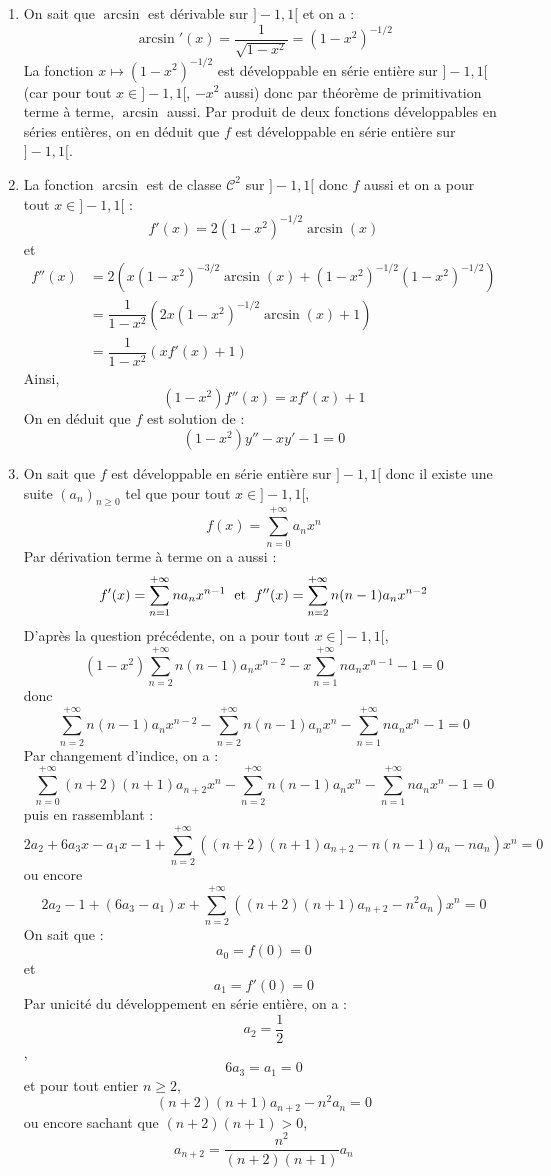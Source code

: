 \documentclass[a4paper,twoside,french,11pt]{VcCours}
\begin{document}
\begin{enumerate}
\item On sait que $\arcsin$ est dérivable sur $]-1,1[$ et on a :
$$ \arcsin'(x) = \dfrac{1}{\sqrt{1-x^2}} = (1-x^2)^{-1/2}$$
La fonction $x \mapsto (1-x^2)^{-1/2}$ est développable en série entière sur $]-1,1[$ (car pour tout $x \in ]-1,1[$, $-x^2$ aussi) donc par théorème de primitivation terme à terme, $\arcsin$ aussi. Par produit de deux fonctions développables en séries entières, on en déduit que $f$ est développable en série entière sur $]-1,1[$.
\item La fonction $\arcsin$ est de classe $\mathcal{C}^2$ sur $]-1,1[$ donc $f$ aussi et on a pour tout $x \in ]-1,1[$ :
$$ f'(x) =  2 (1-x^2)^{-1/2} \arcsin(x)$$
et 
\begin{align*}
f''(x) & = 2 ( x (1-x^2)^{-3/2} \arcsin(x) + (1-x^2)^{-1/2} (1-x^2)^{-1/2}) \\
& = \dfrac{1}{1-x^2} \left( 2x (1-x^2)^{-1/2} \arcsin(x) + 1 \right) \\
& = \dfrac{1}{1-x^2} \left( xf'(x) + 1 \right) 
\end{align*}
Ainsi,
$$ (1-x^2) f''(x) = xf'(x)+1$$
On en déduit que $f$ est solution de :
$$ (1-x^2)y''-xy'-1=0$$
\item On sait que $f$ est développable en série entière sur $]-1,1[$ donc il existe une suite $(a_n)_{n \geq 0}$ tel que pour tout $x \in ]-1,1[$,
$$ f(x)= \sum_{n=0}^{+ \infty} a_n x^n$$
Par dérivation terme à terme on a aussi :
$$ f'(x) = \sum_{n=1}^{+ \infty} n a_n x^{n-1} \; \hbox{ et } \; f''(x) = \sum_{n=2}^{+ \infty} n(n-1) a_n x^{n-2}$$
D'après la question précédente, on a pour tout $x \in ]-1,1[$,
$$ (1-x^2) \sum_{n=2}^{+ \infty} n(n-1) a_n x^{n-2} - x \sum_{n=1}^{+ \infty} n a_n x^{n-1} - 1 = 0$$
donc
$$ \sum_{n=2}^{+ \infty} n(n-1) a_n x^{n-2} - \sum_{n=2}^{+ \infty} n(n-1) a_n x^{n} - \sum_{n=1}^{+ \infty} n a_n x^{n}-1 =0$$
Par changement d'indice, on a :
$$ \sum_{n=0}^{+ \infty} (n+2)(n+1) a_{n+2} x^{n} - \sum_{n=2}^{+ \infty} n(n-1) a_n x^{n} - \sum_{n=1}^{+ \infty} n a_n x^{n}-1 =0$$
puis en rassemblant :
$$ 2a_2+6a_3x  -a_1x-1 + \sum_{n=2}^{+ \infty} ((n+2)(n+1) a_{n+2} - n(n-1) a_n - n a_n)x^n = 0$$
ou encore 
$$ 2a_2-1 + (6a_3-a_1) x  + \sum_{n=2}^{+ \infty} ((n+2)(n+1) a_{n+2} - n^2 a_n)x^n = 0$$
On sait que :
$$ a_0 = f(0) = 0$$
et 
$$ a_1 = f'(0) = 0$$
Par unicité du développement en série entière, on a :
$$ a_2 = \dfrac{1}{2}$$,
$$ 6a_3 = a_1 = 0$$
et pour tout entier $n \geq 2$,
$$ (n+2)(n+1) a_{n+2} - n^2 a_n = 0$$
ou encore sachant que $(n+2)(n+1)>0$,
$$ a_{n+2} = \dfrac{n^2}{(n+2)(n+1)} a_n$$

\end{enumerate}
\end{document}
